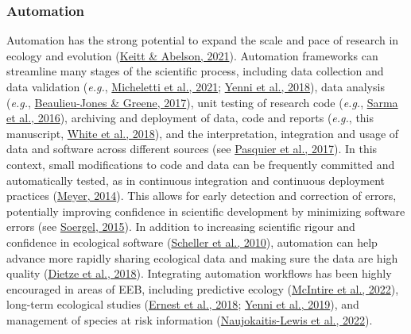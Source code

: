 \hypertarget{automation}{%
\subsubsection{Automation}\label{automation}}

Automation has the strong potential to expand the scale and pace of research in ecology and evolution (\protect\hyperlink{ref-cfgXxgt1}{Keitt \& Abelson, 2021}).
Automation frameworks can streamline many stages of the scientific process, including data collection and data validation (\emph{e.g.}, \protect\hyperlink{ref-bhDgD6lF}{Micheletti et al., 2021}; \protect\hyperlink{ref-lXvpQxeN}{Yenni et al., 2018}), data analysis (\emph{e.g.}, \protect\hyperlink{ref-Qh7xTLwz}{Beaulieu-Jones \& Greene, 2017}), unit testing of research code (\emph{e.g.}, \protect\hyperlink{ref-lYazDTau}{Sarma et al., 2016}), archiving and deployment of data, code and reports (\emph{e.g.}, this manuscript, \protect\hyperlink{ref-SirQKFIz}{White et al., 2018}), and the interpretation, integration and usage of data and software across different sources (see \protect\hyperlink{ref-1FJhfqfiX}{Pasquier et al., 2017}).
In this context, small modifications to code and data can be frequently committed and automatically tested, as in continuous integration and continuous deployment practices (\protect\hyperlink{ref-1Ep9EJL6y}{Meyer, 2014}).
This allows for early detection and correction of errors, potentially improving confidence in scientific development by minimizing software errors (see \protect\hyperlink{ref-ufw0ZdnI}{Soergel, 2015}).
In addition to increasing scientific rigour and confidence in ecological software (\protect\hyperlink{ref-12103x16N}{Scheller et al., 2010}), automation can help advance more rapidly sharing ecological data and making sure the data are high quality (\protect\hyperlink{ref-rTbinQMj}{Dietze et al., 2018}).
Integrating automation workflows has been highly encouraged in areas of EEB, including predictive ecology (\protect\hyperlink{ref-mmCOSRfr}{McIntire et al., 2022}), long-term ecological studies (\protect\hyperlink{ref-RxK4CmfR}{Ernest et al., 2018}; \protect\hyperlink{ref-1CJo8lo2v}{Yenni et al., 2019}), and management of species at risk information (\protect\hyperlink{ref-kZzfmBNu}{Naujokaitis-Lewis et al., 2022}).

